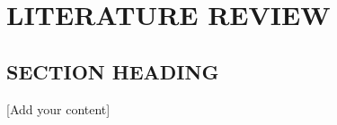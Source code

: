 
\chapter{\texorpdfstring{\centering \textbf{\MakeUppercase{Literature Review}}}{literature Review}}

\section{\textbf{\MakeUppercase{Section Heading}}}
[Add your content]

